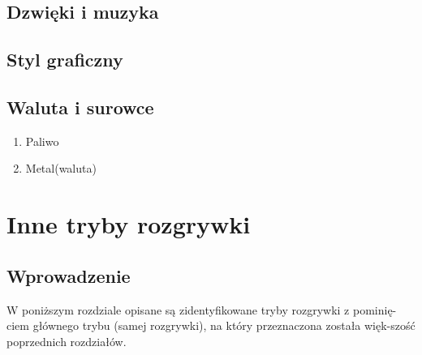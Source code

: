 \documentclass{article}
\begin{document}
    \subsection{Dzwięki i muzyka}
    
    
    \subsection{Styl graficzny}
    
    
    \subsection{Waluta i surowce}
    \begin{enumerate}
        \item Paliwo
        \item Metal(waluta)
    \end{enumerate}
    \newpage
    
\section{Inne tryby rozgrywki}
    \subsection{Wprowadzenie}
    W poniższym rozdziale opisane są zidentyfikowane tryby rozgrywki z pominię-ciem głównego trybu (samej rozgrywki), na który przeznaczona została więk-szość poprzednich rozdziałów.
    
\end{document}
